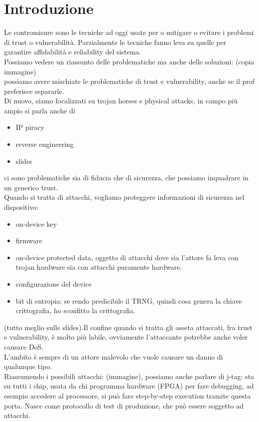 \documentclass[oneside, 12pt]{extbook}
\begin{document}
\section{Introduzione}
Le contromisure sono le tecniche ad oggi usate per o mitigare o evitare i problemi di trust o vulnerabilità. Parzialmente le tecniche fanno leva su quelle per garantire affidabilità e reliability del sistema.\\Possiamo vedere un riassunto delle problematiche ma anche delle soluzioni: (copia immagine)\\possiamo avere mischiate le problematiche di trust e vulnerability, anche se il prof preferisce separarle.\\Di nuovo, siamo focalizzati su trojan horses e physical attacks, in campo più ampio si parla anche di
\begin{itemize}
	\item IP piracy
	\item reverse engineering
	\item slides
\end{itemize} 
ci sono problematiche sia di fiducia che di sicurezza, che possiamo inquadrare in un generico trust.\\Quando si tratta di attacchi, vogliamo proteggere informazioni di sicurezza nel dispositivo:
\begin{itemize}
	\item on-device key
	\item firmware
	\item on-device protected data, oggetto di attacchi dove sia l'attore fa leva con trojan hardware sia con attacchi puramente hardware.
	\item configurazione del device
	\item bit di entropia: se rendo predicibile il TRNG, quindi cosa genera la chiave crittografia, ho sconfitto la crittografia.
\end{itemize} 
(tutto meglio sulle slides).Il confine quando si tratta gli asseta attaccati, fra trust e vulnerability, è molto più labile, ovviamente l'attaccante potrebbe anche voler causare DoS.\\L'ambito è sempre di un attore malevolo che vuole causare un danno di qualunque tipo.\\Riassumendo i possibili attacchi: (immagine), possiamo anche parlare di j-tag: sta su tutti i chip, usata da chi programma hardware (FPGA) per fare debugging, ad esempio accedere al processore, si può fare step-by-step execution tramite questa porta. Nasce come protocollo di test di produzione, che può essere soggetto ad attacchi.
\end{document}
